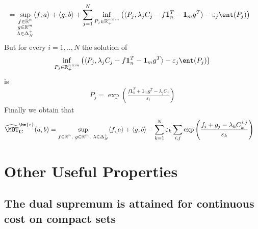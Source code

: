 \begin{prv*}
\begin{align*}
    & = \sup\limits_{\substack{f\in\mathbb{R}^n\\g\in\mathbb{R}^m\\\lambda\in\Delta_N^{+}}} \langle f,a \rangle + \langle g, b \rangle + \sum_{j=1}^N\inf_{P_j\in\mathbb{R}_+^{n\times m}}\left(\langle P_j,\lambda_jC_j-f\mathbf{1}_n^T - \mathbf{1}_m g^T\rangle -\varepsilon_j \ent(P_j) \right)
\end{align*}
But for every $i=1,..,N$ the solution of 
\begin{align*}
    \inf_{P_j\in\mathbb{R}_+^{n\times m}}\left(\langle P_j,\lambda_jC_j-f\mathbf{1}_n^T - \mathbf{1}_m g^T\rangle -\varepsilon_j \ent(P_j)\right)
\end{align*}
is
\begin{align*}
  P_j = \exp\left(\frac{f\mathbf{1}_n^T + \mathbf{1}_m g^T-\lambda_j C_j}{\varepsilon_i}\right)
\end{align*}
Finally we obtain that
\begin{align*}
    \widehat{\MOT}^{\bm{\varepsilon}}_{\mathbf{C}}(a,b)
    &= \sup\limits_{\substack{f\in\mathbb{R}^n,~g\in\mathbb{R}^m,~\lambda\in\Delta_N^{+}}} \langle f,a \rangle + \langle g, b \rangle  - \sum_{k=1}^N \varepsilon_k \sum_{i,j} \exp\left(\frac{f_i+g_j-\lambda_k C_k^{i,j}}{\varepsilon_k}\right)
\end{align*}
\end{prv*}

\section{Other Useful Properties}
\label{sec:other-pptys}

\subsection{The dual supremum is attained for continuous cost on compact sets}
\label{sec:sup-attained}

